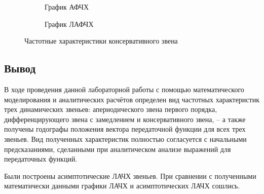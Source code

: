\documentclass[a4paper, 11pt]{article}
\begin{document}
\begin{figure}[h!]
    \begin{subfigure}{0.5\textwidth}
        \centering
        \caption{График АФЧХ}
    \end{subfigure}
    \begin{subfigure}{0.5\textwidth}
        \centering
        \caption{График ЛАФЧХ}
    \end{subfigure}
    \caption{Частотные характеристики консервативного звена}
\end{figure}

\newpage
\begin{center}
	\section*{Вывод}
\end{center}
\par 
В ходе проведения данной лабораторной работы с помощью математического моделирования и аналитических расчётов определен вид частотных характеристик трех динамических звеньев: апериодического звена первого порядка, дифференцирующего звена с замедлением и консервативного звена, – а также получены годографы положения вектора передаточной функции для всех трех звеньев. Вид полученных характеристик полностью согласуется с начальными предсказаниями, сделанными при аналитическом анализе выражений для передаточных функций.
\par
Были построены асимптотические ЛАЧХ звеньев. При сравнении с полученными математически данными графики ЛАЧХ и асимптотических ЛАЧХ сошлись. 
\end{document}
